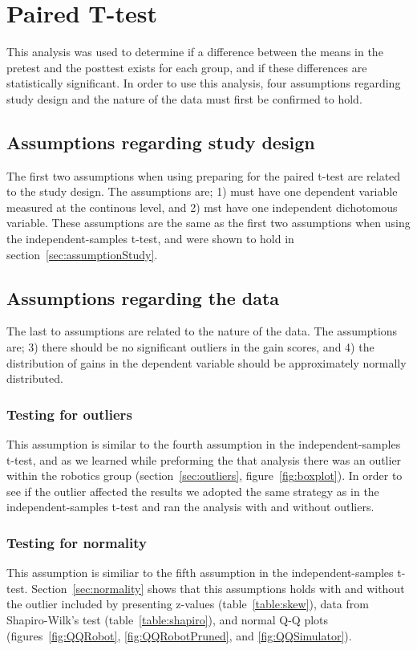 \section{Paired T-test}\label{ch:pairedttest}
This analysis was used to determine if a difference between the means in the pretest and the posttest exists for each group, and if these differences are statistically significant. 
In order to use this analysis, four assumptions regarding study design and the nature of the data must first be confirmed to hold.

\subsection*{Assumptions regarding study design}
The first two assumptions when using preparing for the paired t-test are related to the study design. The assumptions are;
1) must have one dependent variable measured at the continous level, and
2) mst have one independent dichotomous variable.
These assumptions are the same as the first two assumptions when using the independent-samples t-test, and were shown to hold in section~\ref{sec:assumptionStudy}. 

\subsection*{Assumptions regarding the data}
The last to assumptions are related to the nature of the data. 
The assumptions are;
3) there should be no significant outliers in the gain scores, and
4) the distribution of gains in the dependent variable should be approximately normally distributed.

\subsubsection*{Testing for outliers}
This assumption is similar to the fourth assumption in the independent-samples t-test, and as we learned while preforming the that analysis there was an outlier within the robotics group (section~\ref{sec:outliers}, figure~\ref{fig:boxplot}). In order to see if the outlier affected the results we adopted the same strategy as in the independent-samples t-test and ran the analysis with and without outliers.

\subsubsection*{Testing for normality}
This assumption is similiar to the fifth assumption in the independent-samples t-test. Section~\ref{sec:normality} shows that this assumptions holds with and without the outlier included by presenting z-values (table~\ref{table:skew}), data from Shapiro-Wilk's test (table~\ref{table:shapiro}), and normal Q-Q plots (figures~\ref{fig:QQRobot}, \ref{fig:QQRobotPruned}, and \ref{fig:QQSimulator}).

